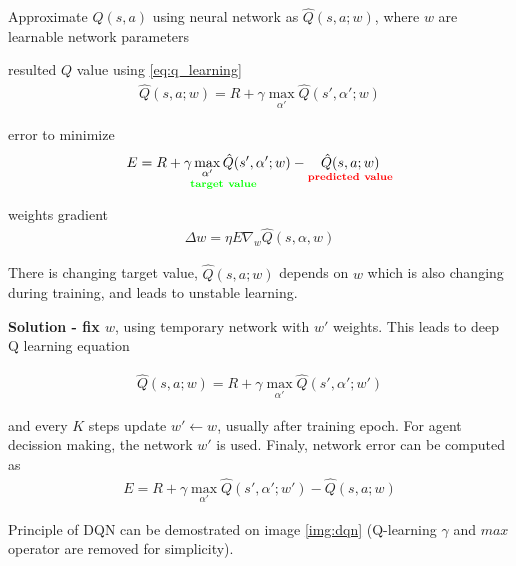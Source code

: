 \documentclass[10pt,a4paper]{article}
\begin{document}
Approximate $Q(s, a)$ using neural network as $\hat{Q}(s, a; w)$, where $w$ are learnable network
parameters

resulted $Q$ value using \ref{eq:q_learning}
\begin{align}
  \hat{Q}(s, a; w) = R + \gamma \max \limits_{\alpha'} \hat{Q}(s', \alpha'; w)
\end{align}

error to minimize
\begin{align}
  E = \underset{\bf \color{green} target\ value}{R + \gamma \max \limits_{\alpha'} \hat{Q}(s', \alpha'; w)} - \underset{\bf \color{red} predicted\ value}{\hat{Q}(s, a; w) }
\end{align}

weights gradient
\begin{align}
  \Delta w = \eta E \nabla _w \hat{Q}(s, \alpha, w)
\end{align}

There is changing target value, $\hat{Q}(s, a; w)$ depends on $w$ which is also changing during training, and leads to unstable learning.

{\bf Solution - fix $w$}, using temporary network with $w'$ weights. This leads to deep Q learning equation

\begin{align}
  \hat{Q}(s, a; w) = R + \gamma \max \limits_{\alpha'} \hat{Q}(s', \alpha'; w')
  \label{eq:dqn}
\end{align}

and every $K$ steps update $w' \leftarrow w$, usually after training epoch.
For agent decission making, the network $w'$ is used.
Finaly, network error can be computed as
\begin{align}
  E = R + \gamma \max \limits_{\alpha'} \hat{Q}(s', \alpha'; w') - \hat{Q}(s, a; w)
  \label{eq:dqn_error}
\end{align}

Principle of DQN can be demostrated on image \ref{img:dqn} (Q-learning $\gamma$ and $max$ operator are removed for
simplicity).
\end{document}
